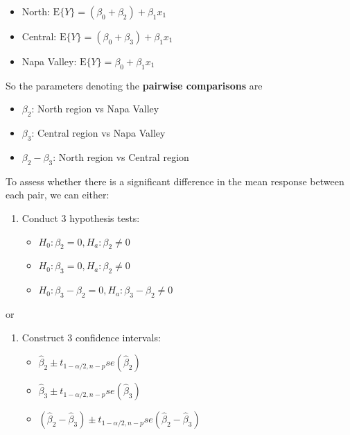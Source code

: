 \documentclass[
]{book}
\providecommand{\tightlist}{%
  \setlength{\itemsep}{0pt}\setlength{\parskip}{0pt}}
\begin{document}
\begin{itemize}
\item
  North: \(\mbox{E}\{Y\} = (\beta_0+\beta_2) + \beta_1x_1\)
\item
  Central: \(\mbox{E}\{Y\} = (\beta_0+\beta_3) + \beta_1x_1\)
\item
  Napa Valley: \(\mbox{E}\{Y\} = \beta_0 + \beta_1x_1\)
\end{itemize}

So the parameters denoting the \textbf{pairwise comparisons} are

\begin{itemize}
\tightlist
\item
  \(\beta_2\): North region vs Napa Valley
\item
  \(\beta_3\): Central region vs Napa Valley
\item
  \(\beta_2 - \beta_3\): North region vs Central region
\end{itemize}

To assess whether there is a significant difference in the mean response between each pair, we can either:

\begin{enumerate}
\def\labelenumi{\arabic{enumi}.}
\item
  Conduct 3 hypothesis tests:

  \begin{itemize}
  \tightlist
  \item
    \(H_0: \beta_2 = 0, H_a: \beta_2 \neq 0\)
  \item
    \(H_0: \beta_3 = 0, H_a: \beta_2 \neq 0\)
  \item
    \(H_0: \beta_3 - \beta_2 = 0, H_a: \beta_3 - \beta_2 \neq 0\)
  \end{itemize}
\end{enumerate}

or

\begin{enumerate}
\def\labelenumi{\arabic{enumi}.}
\setcounter{enumi}{1}
\item
  Construct 3 confidence intervals:

  \begin{itemize}
  \tightlist
  \item
    \(\hat{\beta}_2 \pm t_{1- \alpha/2, n-p} se\left( \hat{\beta}_2 \right)\)
  \item
    \(\hat{\beta}_3 \pm t_{1- \alpha/2, n-p} se\left( \hat{\beta}_3 \right)\)
  \item
    \((\hat{\beta}_2 - \hat{\beta}_3) \pm t_{1- \alpha/2, n-p} se\left(\hat{\beta}_2 - \hat{\beta}_3 \right)\)
  \end{itemize}
\end{enumerate}
\end{document}
